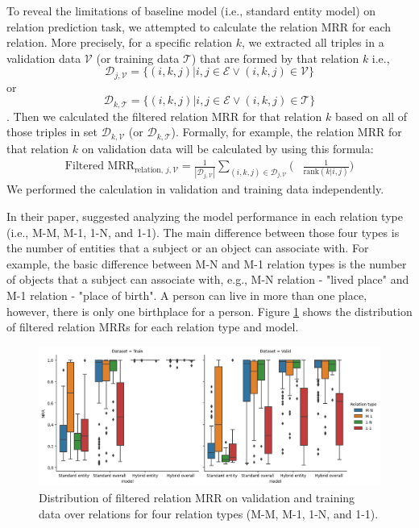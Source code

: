 To reveal the limitations of baseline model (i.e., standard entity model) on relation prediction task, we attempted to calculate the relation MRR for each relation. More precisely, for a specific relation $k$, we extracted all triples in a validation data $\mathcal{V}$ (or training data $\mathcal{T}$) that are formed by that relation $k$ i.e., $$\mathcal{D}_{j,\mathcal{V}} = \{(i,k,j) | i,j \in \mathcal{E} \vee (i,k,j) \in \mathcal{V} \}$$ or $$\mathcal{D}_{k,\mathcal{T}} = \{(i,k,j) | i,j \in \mathcal{E} \vee (i,k,j) \in \mathcal{T} \}$$. Then we calculated the filtered relation MRR for that relation $k$ based on all of those triples in set $\mathcal{D}_{k,\mathcal{V}}$ (or $\mathcal{D}_{k,\mathcal{T}}$). Formally, for example, the relation MRR for that relation $k$ on validation data will be calculated by using this formula:
\begin{equation}
 \begin{split}
    \text{Filtered MRR}_{\text{relation, } j,\mathcal{V}} =
    \frac{1}{|\mathcal{D}_{j,\mathcal{V}}|}
    \sum_{(i,k,j)\in\mathcal{D}_{j,\mathcal{V}}}  
    \bigg(
    & \frac{1}{\text{rank}(k|i,j)} \bigg) 
\end{split}
\end{equation}
We performed the calculation in validation and training data independently. 

In their paper, \citet{chang2020benchmark} suggested analyzing the model performance in each relation type  (i.e., M-M, M-1, 1-N, and 1-1). The main difference between those four types is the number of entities that a subject or an object can associate with. For example, the basic difference between M-N and M-1 relation types is the number of objects that a subject can associate with, e.g., M-N relation - "lived place" and M-1 relation - "place of birth". A person can live in more than one place, however, there is only one birthplace for a person. Figure \ref{fig:RelationMRR boxplot} shows the distribution of filtered relation MRRs for each relation type and model.

\begin{figure}[!htbp]
	\begin{center}
	\includegraphics[width=1.0\linewidth]{Images/RelationMRR_boxplot.png}
	\caption[Distribution of filtered relation MRR]{Distribution of filtered relation MRR on validation and training data over relations for four relation types (M-M, M-1, 1-N, and 1-1).}
	\label{fig:RelationMRR boxplot}
	\end{center}
\end{figure}


